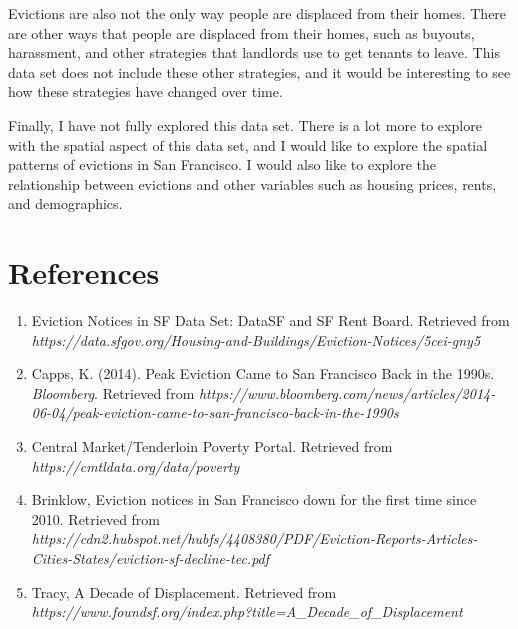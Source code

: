 \documentclass{article}\usepackage[]{graphicx}\usepackage[]{xcolor}
\begin{document}
Evictions are also not the only way people are displaced from their homes. There are other ways that people are displaced from their homes, such as buyouts, harassment, and other strategies that landlords use to get tenants to leave. This data set does not include these other strategies, and it would be interesting to see how these strategies have changed over time.

Finally, I have not fully explored this data set. There is a lot more to explore with the spatial aspect of this data set, and I would like to explore the spatial patterns of evictions in San Francisco. I would also like to explore the relationship between evictions and other variables such as housing prices, rents, and demographics.

    




\section*{References}

\begin{enumerate}
  \item Eviction Notices in SF Data Set: DataSF and SF Rent Board. Retrieved from \textit{https://data.sfgov.org/Housing-and-Buildings/Eviction-Notices/5cei-gny5}
  \item Capps, K. (2014). Peak Eviction Came to San Francisco Back in the 1990s. \textit{Bloomberg}. Retrieved from \textit{https://www.bloomberg.com/news/articles/2014-06-04/peak-eviction-came-to-san-francisco-back-in-the-1990s}
  \item Central Market/Tenderloin Poverty Portal. Retrieved from \textit{https://cmtldata.org/data/poverty}
  \item Brinklow, Eviction notices in San Francisco down for the first time since 2010. Retrieved from \\ \textit{https://cdn2.hubspot.net/hubfs/4408380/PDF/Eviction-Reports-Articles-Cities-States/eviction-sf-decline-tec.pdf}
  \item Tracy, A Decade of Displacement. Retrieved from \textit{https://www.foundsf.org/index.php?title=A\_Decade\_of\_Displacement}
\end{enumerate}
\end{document}
